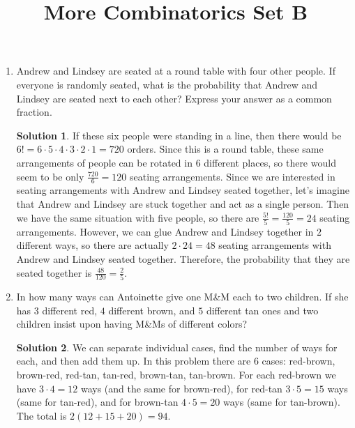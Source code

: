 \documentclass[twocolumn]{article}
\title{More Combinatorics Set B}
\author{}
\date{}
\theoremstyle{definition}
\newtheorem*{solution}{Solution}
\begin{document}
    \maketitle
    \begin{enumerate}
        \item Andrew and Lindsey are seated at a round table with four other people.
        If everyone is randomly seated, what is the probability that Andrew and 
        Lindsey are seated next to each other? Express your answer as a common 
        fraction.
        \begin{solution}
            If these six people were standing in a line, then there would be $6!  
            = 6 \cdot 5 \cdot 4 \cdot 3 \cdot 2 \cdot 1 = 720$ orders. Since 
            this is a round table, these same arrangements of people can be 
            rotated in $6$ different places, so there would seem to be only 
            $\frac{720}{6} = 120$ seating arrangements. Since we are interested 
            in seating arrangements with Andrew and Lindsey seated together, 
            let's imagine that Andrew and Lindsey are stuck together and act as 
            a single person. Then we have the same situation with five people, 
            so there are $\frac{5!}{5} = \frac{120}{5}  = 24$ seating 
            arrangements.  However, we can glue Andrew and Lindsey together in 
            $2$ different ways, so there are actually $2 \cdot 24 = 48$ seating 
            arrangements with Andrew and Lindsey seated together.  Therefore, 
            the probability that they are seated together is $\frac{48}{120} = 
            \frac{2}{5}$.
        \end{solution}
        \item In how many ways can Antoinette give one M\&M each to two children. If she 
        has $3$ different red, $4$ different brown, and $5$ different tan ones and two
        children insist upon having M\&Ms of different colors?
        \begin{solution}
            We can separate individual cases, find the number of ways for each, and then
            add them up. In this problem there are $6$ cases: red-brown, brown-red,
            red-tan, tan-red, brown-tan, tan-brown. For each red-brown we have $3 \cdot 4
            = 12$ ways (and the same for brown-red), for red-tan $3 \cdot 5 = 15$ ways
            (same for tan-red), and for brown-tan $4 \cdot 5 = 20$ ways (same for
            tan-brown). The total is $2(12 + 15 + 20) = 94$.
        \end{solution}

\end{enumerate}
\end{document}
